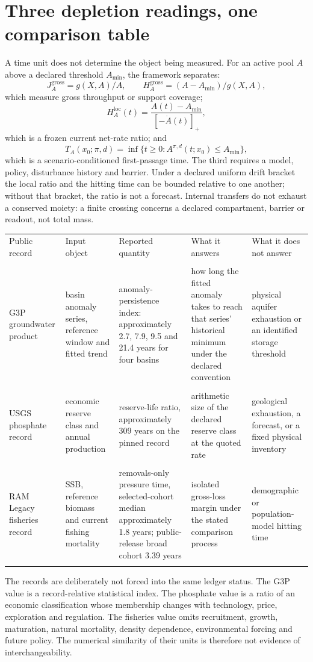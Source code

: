 \documentclass[11pt]{article}
\begin{document}
\section{Three depletion readings, one comparison table}
A time unit does not determine the object being measured. For an active pool \(A\) above a declared threshold \(A_{\min}\), the framework separates:
\[J_A^{\mathrm{gross}}=g(X,A)/A,\qquad H_A^{\mathrm{gross}}=(A-A_{\min})/g(X,A),\]
which measure gross throughput or support coverage;
\[H_A^{\mathrm{loc}}(t)=\frac{A(t)-A_{\min}}{[-\dot A(t)]_+},\]
which is a frozen current net-rate ratio; and
\[T_A(x_0;\pi,d)=\inf\{t\ge0:A^{\pi,d}(t;x_0)\le A_{\min}\},\]
which is a scenario-conditioned first-passage time. The third requires a model, policy, disturbance history and barrier. Under a declared uniform drift bracket the local ratio and the hitting time can be bounded relative to one another; without that bracket, the ratio is not a forecast. Internal transfers do not exhaust a conserved moiety: a finite crossing concerns a declared compartment, barrier or readout, not total mass.
\begin{tabularx}{\linewidth}{XXXXX}
\toprule
Public record & Input object & Reported quantity & What it answers & What it does not answer \\\\
\midrule
G3P groundwater product & basin anomaly series, reference window and fitted trend & anomaly-persistence index: approximately 2.7, 7.9, 9.5 and 21.4 years for four basins & how long the fitted anomaly takes to reach that series' historical minimum under the declared convention & physical aquifer exhaustion or an identified storage threshold \\\\
USGS phosphate record & economic reserve class and annual production & reserve-life ratio, approximately 309 years on the pinned record & arithmetic size of the declared reserve class at the quoted rate & geological exhaustion, a forecast, or a fixed physical inventory \\\\
RAM Legacy fisheries record & SSB, reference biomass and current fishing mortality & removals-only pressure time, selected-cohort median approximately 1.8 years; public-release broad cohort 3.39 years & isolated gross-loss margin under the stated comparison process & demographic or population-model hitting time \\\\
\bottomrule
\end{tabularx}
\medskip
The records are deliberately not forced into the same ledger status. The G3P value is a record-relative statistical index. The phosphate value is a ratio of an economic classification whose membership changes with technology, price, exploration and regulation. The fisheries value omits recruitment, growth, maturation, natural mortality, density dependence, environmental forcing and future policy. The numerical similarity of their units is therefore not evidence of interchangeability.
\end{document}
